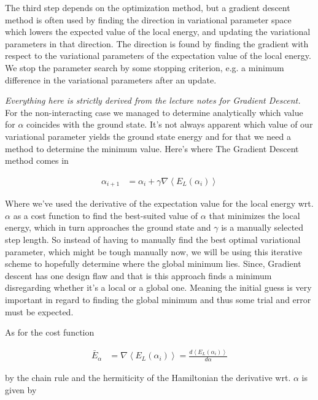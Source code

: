 The third step depends on the optimization method, but a gradient descent method is often used by finding the direction in variational parameter space which lowers the expected value of the local energy, and updating the variational parameters in that direction. The direction is found by finding the gradient with respect to the variational parameters of the expectation value of the local energy. We stop the parameter search by some stopping criterion, e.g. a minimum difference in the variational parameters after an update. 

\textit{Everything here is strictly derived from the lecture notes \cite{Gradient-Descent} for Gradient Descent.} \\

For the non-interacting case we managed to determine analytically which value for $\alpha$ coincides with the ground state. It's not always apparent which value of our variational parameter yields the ground state energy and for that we need a method to determine the minimum value. Here's where The Gradient Descent method comes in

\begin{align}
    \alpha_{i+1} &= \alpha_i + \gamma \nabla \left\langle E_L (\alpha_i) \right\rangle
\end{align}

Where we've used the derivative of the expectation value for the local energy wrt. $\alpha$ as a cost function to find the best-suited value of $\alpha$ that minimizes the local energy, which in turn approaches the ground state and $\gamma$ is a manually selected step length. So instead of having to manually find the best optimal variational parameter, which might be tough manually now, we will be using this iterative scheme to hopefully determine where the global minimum lies. Since, Gradient descent has one design flaw and that is this approach finds a minimum disregarding whether it's a local or a global one. Meaning the initial guess is very important in regard to finding the global minimum and thus some trial and error must be expected.

As for the cost function 

\begin{align}
    \bar{E}_\alpha &= \nabla \left\langle E_L (\alpha_i) \right\rangle = \frac{d\left\langle E_L (\alpha_i) \right\rangle}{d\alpha}
\end{align}

by the chain rule and the hermiticity of the Hamiltonian the derivative wrt. $\alpha$ is given by

